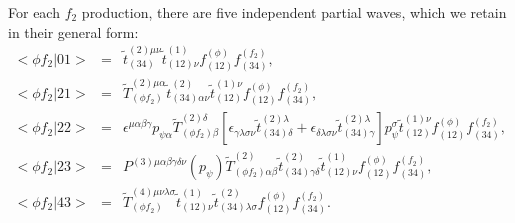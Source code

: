 For each $f_2$ production, there are five independent partial
waves, which we retain in their general form:
\begin{eqnarray}
<\phi f_2|01> \!&=&\! \tilde t^{(2)\mu\nu}_{(34)} \tilde
t^{(1)}_{(12)\nu}f_{(12)}^{(\phi)}f_{(34)}^{(f_2)} , \\
<\phi f_2|21> \!&=&\! \tilde T^{(2)\mu\alpha}_{(\phi f_2)} \tilde
t^{(2)}_{(34)\alpha\nu}\tilde t^{(1)\nu}_{(12)}
        f_{(12)}^{(\phi)} f_{(34)}^{(f_2)}, \\
<\phi f_2|22> \!&=&\! \epsilon^{\mu\alpha\beta\gamma}
p_{\psi\alpha} \tilde T^{(2)\delta}_{(\phi f_2)\beta}
[\epsilon_{\gamma\lambda\sigma\nu} \tilde
t^{(2)\lambda}_{(34)\delta} +\epsilon_{\delta\lambda\sigma\nu}
\tilde t^{(2)\lambda}_{(34)\gamma}]p_\psi^\sigma \tilde
t^{(1)\nu}_{(12)}f_{(12)}^{(\phi)}f_{(34)}^{(f_2)}, \\
<\phi f_2|23> \!&=&\! P^{(3)\mu\alpha\beta\gamma\delta\nu}(p_\psi)
\tilde T^{(2)}_{(\phi f_2)\alpha\beta} \tilde
t^{(2)}_{(34)\gamma\delta} \tilde t^{(1)}_{(12)\nu}
f_{(12)}^{(\phi)}f_{(34)}^{(f_2)}, \\
<\phi f_2|43> \!&=&\! \tilde T^{(4)\mu\nu\lambda\sigma}_{(\phi
f_2)}
    \tilde t^{(1)}_{(12)\nu} \tilde t^{(2)}_{(34)\lambda\sigma}
        f_{(12)}^{(\phi)}f_{(34)}^{(f_2)}.
\end{eqnarray}

